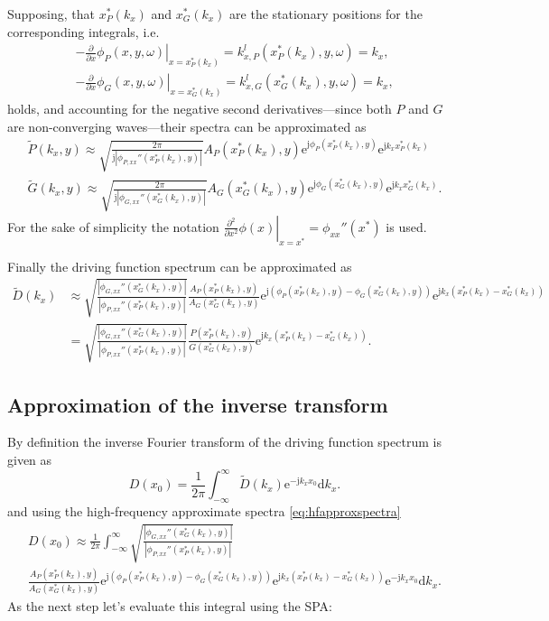 \documentclass[12pt,a4paper]{article}
\newcommand{\td}{\mathrm{d}}
\newcommand{\te}{\mathrm{e}}
\newcommand{\ti}{\mathrm{j}}
\begin{document}
Supposing, that $x^*_P(k_x)$ and $x^*_G(k_x)$ are the stationary positions for the corresponding integrals, i.e. 
\begin{eqnarray}
- \left. \frac{\partial}{\partial x} \phi_P(x,y,\omega) \right|_{x = x^*_P(k_x)} = k_{x,P}^l(x^*_P(k_x),y,\omega) = k_x, \label{eq:klP} \\
- \left. \frac{\partial}{\partial x} \phi_G(x,y,\omega) \right|_{x = x^*_G(k_x)} = k_{x,G}^l(x^*_G(k_x),y,\omega) = k_x, \label{eq:klG} 
\label{eq:xP_xG_in_spatial_domain}
\end{eqnarray}
holds, and accounting for the negative second derivatives---since both $P$ and $G$ are non-converging waves---their spectra can be approximated as
\begin{eqnarray}
\tilde{P}(k_x,y) \approx \sqrt{\frac{2\pi}{\ti |\phi_{P,xx}''(x^*_P(k_x),y)|}} A_P(x^*_P(k_x),y) \te^{\ti \phi_P(x^*_P(k_x),y)} \te^{\ti k_x x^*_P(k_x)}
\\
\tilde{G}(k_x,y) \approx \sqrt{\frac{2\pi}{\ti |\phi_{G,xx}''(x^*_G(k_x),y)|}} A_G(x^*_G(k_x),y) \te^{\ti \phi_G(x^*_G(k_x),y)} \te^{\ti k_x x^*_G(k_x)}
.
\end{eqnarray}
For the sake of simplicity the notation $\left. \frac{\partial^2}{\partial x^2} \phi(x)\right|_{x = x^*} = \phi_{xx}''(x^*)$ is used.

Finally the driving function spectrum can be approximated as
\begin{align}
\tilde{D}(k_x)
&\approx 
\sqrt{\frac{|\phi_{G,xx}''(x^*_G(k_x),y)|}{|\phi_{P,xx}''(x^*_P(k_x),y)|}}
\frac{A_P(x^*_P(k_x),y)}{A_G(x^*_G(k_x),y)}
\te^{\ti \left( \phi_P(x^*_P(k_x),y) - \phi_G(x^*_G(k_x),y)\right)}
\te^{\ti k_x \left( x^*_P(k_x) - x^*_G(k_x)\right)}
\label{eq:hfapproxspectra}
\\
&=\sqrt{\frac{|\phi_{G,xx}''(x^*_G(k_x),y)|}{|\phi_{P,xx}''(x^*_P(k_x),y)|}}
\frac{P(x^*_P(k_x),y)}{G(x^*_G(k_x),y)}
\te^{\ti k_x \left( x^*_P(k_x) - x^*_G(k_x)\right)}.
\end{align}


\subsection{Approximation of the inverse transform}

By definition the inverse Fourier transform of the driving function spectrum is given as
\begin{equation}
D(x_0) = \frac{1}{2\pi} \int_{-\infty}^{\infty} \tilde{D}(k_x) \te^{-\ti k_x x_0} \td k_x.
\label{eq:inverse_transform}
\end{equation}
and using the high-frequency approximate spectra \eqref{eq:hfapproxspectra}
\begin{multline}
D(x_0) \approx \frac{1}{2\pi} \int_{-\infty}^{\infty} 
\sqrt{\frac{|\phi_{G,xx}''(x^*_G(k_x),y)|}{|\phi_{P,xx}''(x^*_P(k_x),y)|}}
\\
\frac{A_P(x^*_P(k_x),y)}{A_G(x^*_G(k_x),y)}
\te^{\ti \left( \phi_P(x^*_P(k_x),y) - \phi_G(x^*_G(k_x),y)\right)}
\te^{\ti k_x \left( x^*_P(k_x) - x^*_G(k_x)\right)}
 \te^{-\ti k_x x_0} \td k_x.
\label{eq:inverse_transform_2}
\end{multline}
As the next step let's evaluate this integral using the SPA:
\end{document}
